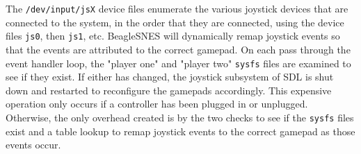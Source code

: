 The \texttt{/dev/input/jsX} device files enumerate the various joystick devices that are connected to the system, in the order that they are connected, using the device files \texttt{js0}, then \texttt{js1}, etc.  BeagleSNES will dynamically remap joystick events so that the events are attributed to the correct gamepad.  On each pass through the event handler loop, the "player one" and "player two" \texttt{sysfs} files are examined to see if they exist.  If either has changed, the joystick subsystem of SDL is shut down and restarted to reconfigure the gamepads accordingly.  This expensive operation only occurs if a controller has been plugged in or unplugged.  Otherwise, the only overhead created is by the two checks to see if the \texttt{sysfs} files exist and a table lookup to remap joystick events to the correct gamepad as those events occur.
